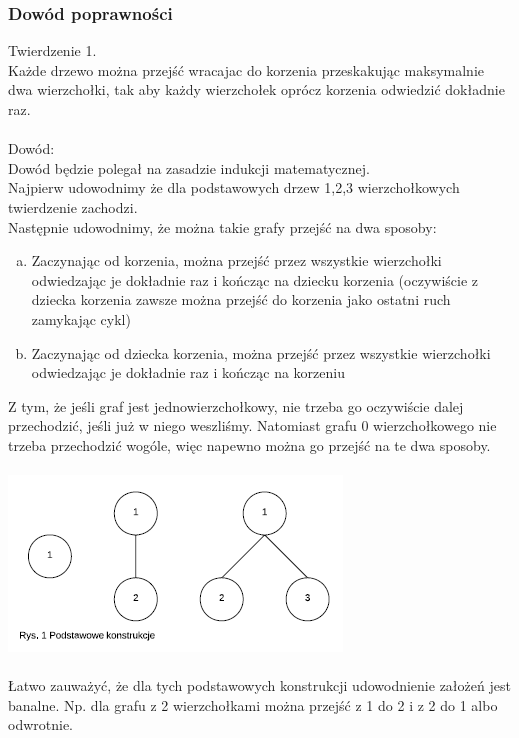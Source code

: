 \subsubsection{Dowód poprawności}
Twierdzenie 1.\\
	Każde drzewo można przejść wracajac do korzenia przeskakując maksymalnie dwa wierzchołki, tak aby każdy wierzchołek oprócz korzenia odwiedzić dokładnie raz.\\\\
Dowód:\\
	Dowód będzie polegał na zasadzie indukcji matematycznej.\\ Najpierw udowodnimy że dla podstawowych drzew 1,2,3 wierzchołkowych twierdzenie zachodzi.\\
	Następnie udowodnimy, że można takie grafy przejść na dwa sposoby:
	\begin{enumerate}[a.]
	\item Zaczynając od korzenia, można przejść przez wszystkie wierzchołki odwiedzając je dokładnie raz i kończąc na dziecku korzenia (oczywiście z dziecka korzenia zawsze można przejść do korzenia jako ostatni ruch zamykając cykl)
	\item Zaczynając od dziecka korzenia, można przejść przez wszystkie wierzchołki odwiedzając je dokładnie raz i kończąc na korzeniu
	\end{enumerate}
	Z tym, że jeśli graf jest jednowierzchołkowy, nie trzeba go oczywiście dalej przechodzić, jeśli już w niego weszliśmy. Natomiast grafu 0 wierzchołkowego nie trzeba przechodzić wogóle, więc napewno można go przejść na te dwa sposoby.\\\\

	\includegraphics{rys1}\\\\
	
	Łatwo zauważyć, że dla tych podstawowych konstrukcji udowodnienie założeń jest banalne. Np. dla grafu z 2 wierzchołkami można przejść z 1 do 2 i z 2 do 1 albo odwrotnie.\\\\

